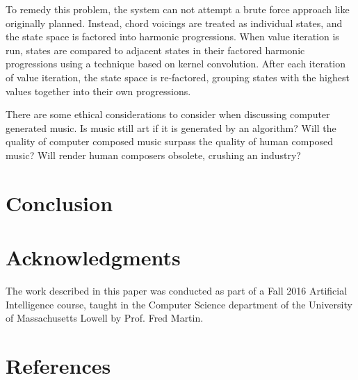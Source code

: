 \documentclass{chi2009}
\begin{document}
To remedy this problem, the system can not attempt a brute force approach like originally planned.  Instead, chord voicings are treated as individual states, and the state space is factored into harmonic progressions.  When value iteration is run, states are compared to adjacent states in their factored harmonic progressions using a technique based on kernel convolution.  After each iteration of value iteration, the state space is re-factored, grouping states with the highest values together into their own progressions.

There are some ethical considerations to consider when discussing computer generated music.  Is music still art if it is generated by an algorithm?
Will the quality of computer composed music surpass the quality of human composed music?  Will render human composers obsolete, crushing an industry?  

\section{Conclusion}

\section{Acknowledgments}
The work described in this paper was conducted as part of a Fall 2016 Artificial Intelligence course, taught in the Computer Science department of the University of Massachusetts Lowell by Prof. Fred Martin.

\section{References}
\end{document}
